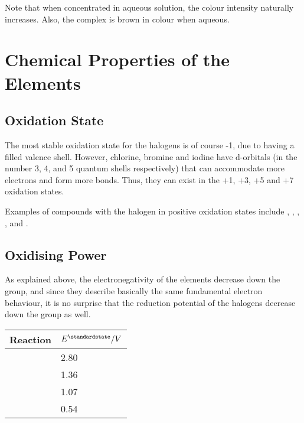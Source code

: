 			Note that when concentrated in aqueous solution, the colour intensity naturally increases. Also, the  complex is brown
			in colour when aqueous.





	\pagebreak
	\section{Chemical Properties of the Elements}

		\subsection{Oxidation State}

			The most stable oxidation state for the halogens is of course -1, due to having a filled valence shell. However, chlorine, bromine
			and iodine have  d-orbitals (in the number 3, 4, and 5 quantum shells respectively) that can accommodate more
			electrons and form more bonds. Thus, they can exist in the +1, +3, +5 and +7 oxidation states.

			Examples of compounds with the halogen in positive oxidation states include , , , ,
			and .



		\subsection{Oxidising Power}

			As explained above, the electronegativity of the elements decrease down the group, and since they describe basically the same
			fundamental electron behaviour, it is no surprise that the reduction potential of the halogens decrease down the group as well.

			\begin{center}\begin{table}[htb]\renewcommand{\arraystretch}{1.5}
			\begin{tabu} to \textwidth {X[c,m] | X[c,m]}

				Reaction					&	$E^{\stdst} / V$	\\	\hline
						&	\num[retain-explicit-plus]{+2.80}	\\	\hline
					&	\num[retain-explicit-plus]{+1.36}	\\	\hline
					&	\num[retain-explicit-plus]{+1.07}	\\	\hline
						&	\num[retain-explicit-plus]{+0.54}	\\	\hline

			\end{tabu}
			\end{table}\end{center}\vspace{-10mm}

